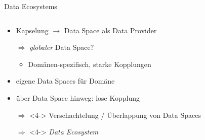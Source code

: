 \begin{frame}{Data Ecosystems \footnotesize\cite{mollerIndustrialDataEcosystems2024}}
    \begin{columns}
        \begin{column}{0.6\textwidth}
            \begin{itemize}
                \item Kapselung $\to$ Data Space als Data Provider
                
                \item[$\Rightarrow$] \emph{globaler} Data Space?
                \begin{itemize}
                    \item<2-> Domänen-spezifisch, starke Kopplungen
                \end{itemize}

                \item<3-> eigene Data Spaces für Domäne
                \item<3-> über Data Space hinweg: lose Kopplung

                \item[$\Rightarrow$]<4-> Verschachtelung / Überlappung von Data Spaces
                \item[$\Rightarrow$]<4-> \alert{\emph{Data Ecosystem}}

                


\end{itemize}
\end{column}
\end{columns}
\end{frame}
